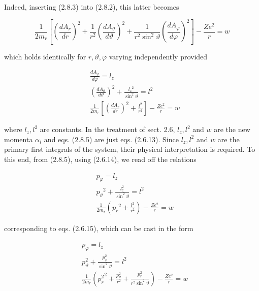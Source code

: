 \documentclass{article}
\begin{document}
Indeed, inserting (2.8.3) into (2.8.2), this latter becomes
 
\begin{equation*}
\frac{1}{2 m_{r}}\left[\left(\frac{d A_{r}}{d r}\right)^{2}+\frac{1}{r^{2}}\left(\frac{d A_{\vartheta}}{d \vartheta}\right)^{2}+\frac{1}{r^{2} \sin ^{2} \vartheta}\left(\frac{d A_{\varphi}}{d \varphi}\right)^{2}\right]-\frac{Z e^{2}}{r}=w \tag{2.8.4}
\end{equation*}
 
which holds identically for $r, \vartheta, \varphi$ varying independently provided
 
\begin{align*}
& \frac{d A_{\varphi}}{d \varphi}=l_{z}  \tag{2.8.5a}\\
& \left(\frac{d A_{\vartheta}}{d \vartheta}\right)^{2}+\frac{l_{z}{ }^{2}}{\sin ^{2} \vartheta}=l^{2}  \tag{2.8.5~b}\\
& \frac{1}{2 m_{r}}\left[\left(\frac{d A_{r}}{d r}\right)^{2}+\frac{l^{2}}{r^{2}}\right]-\frac{Z e^{2}}{r}=w \tag{2.8.5c}
\end{align*}
 
where $l_{z}, l^{2}$ are constants. In the treatment of sect. 2.6, $l_{z}, l^{2}$ and $w$ are the new momenta $\alpha_{i}$ and eqs. (2.8.5) are just eqs. (2.6.13). Since $l_{z}, l^{2}$ and $w$ are the primary first integrals of the system, their physical interpretation is required. To this end, from (2.8.5), using (2.6.14), we read off the relations
 
\begin{align*}
& p_{\varphi}=l_{z}  \tag{2.8.6a}\\
& p_{\vartheta}{ }^{2}+\frac{l_{z}^{2}}{\sin ^{2} \vartheta}=l^{2}  \tag{2.8.6b}\\
& \frac{1}{2 m_{r}}\left(p_{r}{ }^{2}+\frac{l^{2}}{r^{2}}\right)-\frac{Z e^{2}}{r}=w \tag{2.8.6c}
\end{align*}
 
corresponding to eqs. (2.6.15), which can be cast in the form
 
\begin{align*}
& p_{\varphi}=l_{z}  \tag{2.8.7a}\\
& p_{\vartheta}^{2}+\frac{p_{\varphi}^{2}}{\sin ^{2} \vartheta}=l^{2}  \tag{2.8.7b}\\
& \frac{1}{2 m_{r}}\left({p_{r}^{2}}^{2}+\frac{p_{\vartheta}^{2}}{r^{2}}+\frac{p_{\varphi}^{2}}{r^{2} \sin ^{2} \vartheta}\right)-\frac{Z e^{2}}{r}=w \tag{2.8.7c}
\end{align*}
 
\end{document}
